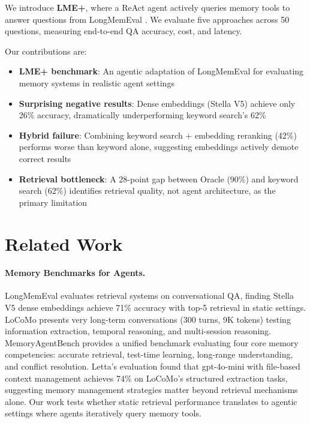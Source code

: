 \documentclass{article}
\begin{document}
We introduce \textbf{LME+}, where a ReAct agent \cite{yao2023react} actively queries memory tools to answer questions from LongMemEval \cite{wu2024longmemeval}. We evaluate five approaches across 50 questions, measuring end-to-end QA accuracy, cost, and latency.

Our contributions are:
\begin{itemize}
    \item \textbf{LME+ benchmark}: An agentic adaptation of LongMemEval for evaluating memory systems in realistic agent settings
    \item \textbf{Surprising negative results}: Dense embeddings (Stella V5) achieve only 26\% accuracy, dramatically underperforming keyword search's 62\%
    \item \textbf{Hybrid failure}: Combining keyword search + embedding reranking (42\%) performs worse than keyword alone, suggesting embeddings actively demote correct results
    \item \textbf{Retrieval bottleneck}: A 28-point gap between Oracle (90\%) and keyword search (62\%) identifies retrieval quality, not agent architecture, as the primary limitation
\end{itemize}

\section{Related Work}
\label{sec:related}

\paragraph{Memory Benchmarks for Agents.}
LongMemEval \cite{wu2024longmemeval} evaluates retrieval systems on conversational QA, finding Stella V5 dense embeddings achieve 71\% accuracy with top-5 retrieval in static settings. LoCoMo \cite{maharana2024locomo} presents very long-term conversations (300 turns, 9K tokens) testing information extraction, temporal reasoning, and multi-session reasoning. MemoryAgentBench \cite{hu2025memoryagentbench} provides a unified benchmark evaluating four core memory competencies: accurate retrieval, test-time learning, long-range understanding, and conflict resolution. Letta's evaluation \cite{letta2025} found that gpt-4o-mini with file-based context management achieves 74\% on LoCoMo's structured extraction tasks, suggesting memory management strategies matter beyond retrieval mechanisms alone. Our work tests whether static retrieval performance translates to agentic settings where agents iteratively query memory tools.
\end{document}
